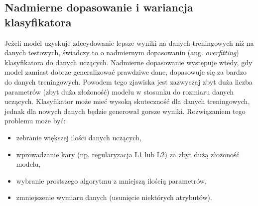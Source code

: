 \subsection{Nadmierne dopasowanie i wariancja klasyfikatora}
Jeżeli model uzyskuje zdecydowanie lepsze wyniki na danych treningowych niż na danych testowych, świadczy to o nadmiernym dopasowaniu (ang. \textit{overfitting}) klasyfikatora do danych uczących. Nadmierne dopasowanie występuje wtedy, gdy model zamiast dobrze generalizować prawdziwe dane, dopasowuje się za bardzo do danych treningowych. Powodem tego zjawiska jest zazwyczaj zbyt duża liczba parametrów (zbyt duża złożoność) modelu w stosunku do rozmiaru danych uczących. Klasyfikator może mieć wysoką skuteczność dla danych treningowych, jednak dla nowych danych będzie generował gorsze wyniki. Rozwiązaniem tego problemu może być:
\begin{itemize}
	\item zebranie większej ilości danych uczących,
	\item wprowadzanie kary (np. regularyzacja L1 lub L2) za zbyt dużą złożoność modelu,
	\item wybranie prostszego algorytmu z mniejszą ilością parametrów,
	\item zmniejszenie wymiaru danych (usunięcie niektórych atrybutów).
\end{itemize}

